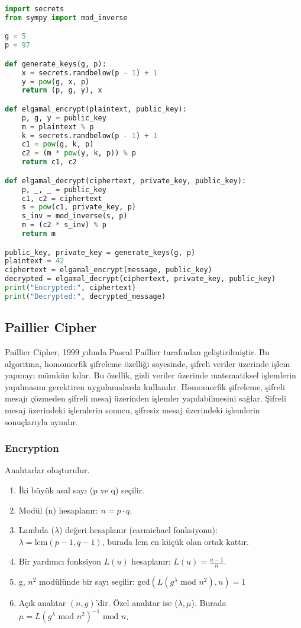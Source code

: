 \begin{lstlisting}[language=Python]
import secrets
from sympy import mod_inverse

g = 5
p = 97

def generate_keys(g, p):
    x = secrets.randbelow(p - 1) + 1
    y = pow(g, x, p)
    return (p, g, y), x

def elgamal_encrypt(plaintext, public_key):
    p, g, y = public_key
    m = plaintext % p
    k = secrets.randbelow(p - 1) + 1
    c1 = pow(g, k, p)
    c2 = (m * pow(y, k, p)) % p
    return c1, c2

def elgamal_decrypt(ciphertext, private_key, public_key):
    p, _, _ = public_key
    c1, c2 = ciphertext
    s = pow(c1, private_key, p)
    s_inv = mod_inverse(s, p)
    m = (c2 * s_inv) % p
    return m

public_key, private_key = generate_keys(g, p)
plaintext = 42
ciphertext = elgamal_encrypt(message, public_key)
decrypted = elgamal_decrypt(ciphertext, private_key, public_key)
print("Encrypted:", ciphertext)
print("Decrypted:", decrypted_message)
\end{lstlisting}

\newpage

\subsection{Paillier Cipher}

Paillier Cipher, 1999 yılında Pascal Paillier tarafından geliştirilmiştir. Bu algoritma, homomorfik şifreleme özelliği sayesinde, şifreli veriler üzerinde işlem yapmayı mümkün kılar. Bu özellik, gizli veriler üzerinde matematiksel işlemlerin yapılmasını gerektiren uygulamalarda kullanılır. Homomorfik şifreleme, şifreli mesajı çözmeden şifreli mesaj üzerinden işlemler yapılabilmesini sağlar. Şifreli mesaj üzerindeki işlemlerin sonucu, şifresiz mesaj üzerindeki işlemlerin sonuçlarıyla aynıdır.

\subsubsection{Encryption}

Anahtarlar oluşturulur.

\begin{enumerate}
    \item İki büyük asal sayı (p ve q) seçilir.
    \item Modül (n) hesaplanır: $n = p \cdot q$.
    \item Lambda ($\lambda$) değeri hesaplanır (carmichael fonksiyonu): $\lambda = \text{lcm}(p - 1, q - 1)$, burada lcm en küçük olan ortak kattır.
    \item Bir yardımcı fonksiyon $L(u)$ hesaplanır: $L(u) = \frac{u - 1}{n}$.
    \item g, $n^2$ modülünde bir sayı seçilir: $\text{gcd}(L(g^{\lambda} \text{ mod } n^2), n) = 1$
    \item Açık anahtar $(n, g)$'dir. Özel anahtar ise ($\lambda, \mu$). Burada $\mu = L(g^{\lambda} \text{ mod } n^2)^{-1} \text{ mod } n$.
\end{enumerate}


